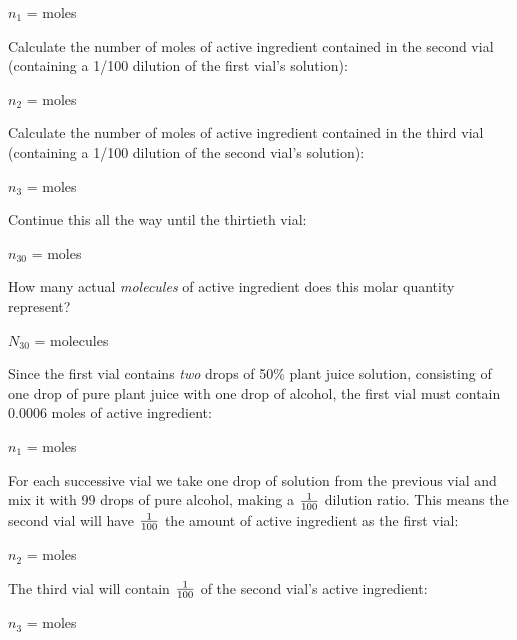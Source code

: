 $n_1$ = \underbar{\hskip 50pt} moles

\vskip 20pt

Calculate the number of moles of active ingredient contained in the second vial (containing a 1/100 dilution of the first vial's solution):

$n_2$ = \underbar{\hskip 50pt} moles

\vskip 20pt

Calculate the number of moles of active ingredient contained in the third vial (containing a 1/100 dilution of the second vial's solution):

$n_3$ = \underbar{\hskip 50pt} moles

\vskip 20pt

Continue this all the way until the thirtieth vial:

$n_{30}$ = \underbar{\hskip 50pt} moles

\vskip 20pt

How many actual {\it molecules} of active ingredient does this molar quantity represent?

$N_{30}$ = \underbar{\hskip 50pt} molecules

\vskip 20pt







Since the first vial contains {\it two} drops of 50\% plant juice solution, consisting of one drop of pure plant juice with one drop of alcohol, the first vial must contain 0.0006 moles of active ingredient:

\vskip 10pt

$n_1$ =  moles

\vskip 10pt

For each successive vial we take one drop of solution from the previous vial and mix it with 99 drops of pure alcohol, making a $1 \over 100$ dilution ratio.  This means the second vial will have $1 \over 100$ the amount of active ingredient as the first vial:

\vskip 10pt

$n_2$ =  moles

\vskip 10pt

The third vial will contain $1 \over 100$ of the second vial's active ingredient:

\vskip 10pt

$n_3$ =  moles

